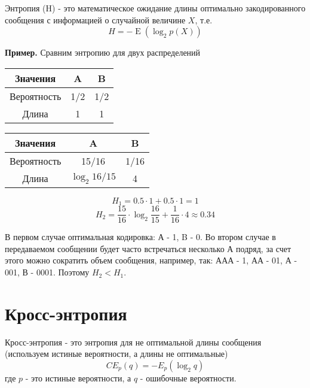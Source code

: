\documentclass[12pt]{article} %
\theoremstyle{definition} %
\DeclareMathOperator{\E}{E}
\begin{document}
    Энтропия (H) - это математическое ожидание длины оптимально закодированного сообщения с информацией о случайной величине $X$, т.е.
    \[
    H = -\E(\log_2 p(X))
    \]
    
    \textbf{Пример.}
    Сравним энтропию для двух распределений
    
    \begin{table}[!hbt]
		\begin{center}
		\label{tab:simParameters}
		\begin{tabular}{ccc}
			\hline
			Значения & A & B \\
			\hline
			Вероятность & 1/2 & 1/2 \\
			\hline
			Длина & 1 & 1 \\
			\hline
		\end{tabular}
		\end{center}
	\end{table}

    \begin{table}[!hbt]
		\begin{center}
		\label{tab:simParameters}
		\begin{tabular}{ccc}
			\hline
			Значения & A & B \\
			\hline
			Вероятность & 15/16 & 1/16 \\
			\hline
			Длина & $\log_2 16/15$ & 4 \\
			\hline
		\end{tabular}
		\end{center}
	\end{table}
    
    \[
    H_1 = 0.5\cdot1 + 0.5\cdot1 = 1 
    \]
    \[
    H_2 = \dfrac{15}{16}\cdot\log_2 \dfrac{16}{15} + \dfrac{1}{16}\cdot4 \approx0.34
    \]
    
        В первом случае оптимальная кодировка: А - 1, B - 0. Во втором случае в передаваемом сообщении будет часто встречаться несколько А подряд, за счет этого можно сократить объем сообщения, например, так: ААА - 1, АА - 01, А - 001, В - 0001. Поэтому $H_2 < H_1$.
    
\section{Кросс-энтропия}
    Кросс-энтропия - это энтропия для не оптимальной длины сообщения (используем истиные вероятности, а длины не оптимальные)
    \[
    CE_p (q) = -E_p (\log_2 q)
    \]
    где $p$ - это истиные вероятности, а $q$ - ошибочные вероятности.
    
\end{document}
